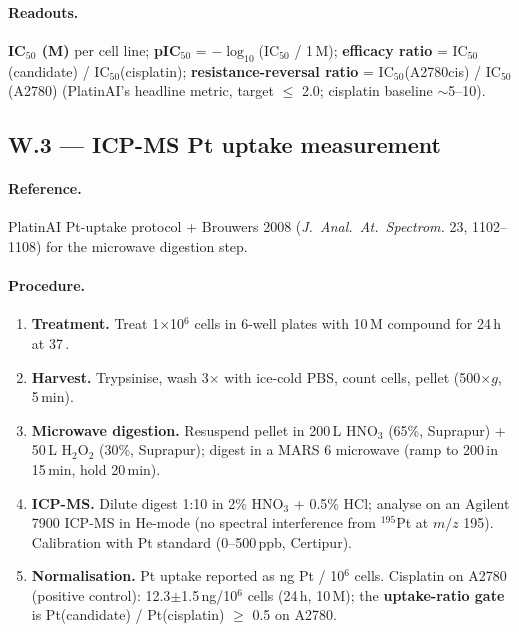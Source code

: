 \paragraph{Readouts.}
\textbf{IC$_{50}$ (\textmu M)} per cell line;
\textbf{pIC$_{50}$} = $-\log_{10}$(IC$_{50}$ / 1\,M);
\textbf{efficacy ratio} = IC$_{50}$(candidate) /
IC$_{50}$(cisplatin); \textbf{resistance-reversal ratio}
= IC$_{50}$(A2780cis) / IC$_{50}$(A2780) (PlatinAI's
headline metric, target $\leq$ 2.0; cisplatin baseline
$\sim$5--10).

\subsection{W.3 --- ICP-MS Pt uptake measurement}
\label{appendix:W-icpms}

\paragraph{Reference.}
PlatinAI Pt-uptake protocol
\citep{rusanov2025platinai} + Brouwers 2008
(\emph{J.~Anal.~At.~Spectrom.} 23, 1102--1108) for the
microwave digestion step.

\paragraph{Procedure.}
\begin{enumerate}
  \item \textbf{Treatment.}  Treat 1$\times$10$^6$ cells in
        6-well plates with 10\,\textmu M compound for
        24\,h at 37\,\textcelsius.
  \item \textbf{Harvest.}  Trypsinise, wash 3$\times$ with
        ice-cold PBS, count cells, pellet
        (500$\times g$, 5\,min).
  \item \textbf{Microwave digestion.}  Resuspend pellet in
        200\,\textmu L HNO$_3$ (65\%, Suprapur) + 50\,\textmu L
        H$_2$O$_2$ (30\%, Suprapur); digest in a
        MARS 6 microwave (ramp to 200\,\textcelsius in
        15\,min, hold 20\,min).
  \item \textbf{ICP-MS.}  Dilute digest 1:10 in 2\% HNO$_3$
        + 0.5\% HCl; analyse on an Agilent 7900
        ICP-MS in He-mode (no spectral interference from
        $^{195}$Pt at $m/z$ 195).  Calibration with Pt
        standard (0--500\,ppb, Certipur).
  \item \textbf{Normalisation.}  Pt uptake reported as
        ng Pt / 10$^6$ cells.  Cisplatin on A2780
        (positive control): 12.3$\pm$1.5\,ng/10$^6$ cells
        (24\,h, 10\,\textmu M); the \textbf{uptake-ratio
        gate} is Pt(candidate) / Pt(cisplatin) $\geq$ 0.5
        on A2780.
\end{enumerate}

